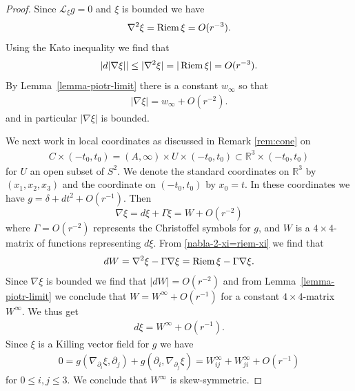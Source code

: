 \documentclass[a4paper,10pt,reqno]{amsart}
\newcommand{\Reals}{\mathbb{R}}
\newcommand{\Riem}{\mathop{\rm Riem}}
\theoremstyle{plain}
\newcommand{\Lie}{\mathcal{L}}
\numberwithin{equation}{section}
\begin{document}
\begin{proof}

Since $\Lie_\xi g = 0$ and $\xi$ is bounded we have 
\begin{equation} \label{nabla-2-xi=riem-xi}
\nabla^2 \xi = \Riem \xi = O(r^{-3}).
\end{equation}
Using the Kato inequality we find that 
\begin{align} 
|d |\nabla \xi| | \leq |\nabla^2 \xi| = |\Riem \xi| = O(r^{-3}).
\end{align} 
By Lemma~\ref{lemma-piotr-limit} there is a constant $w_\infty$ so that
\begin{align} 
|\nabla \xi| = w_\infty + O(r^{-2}).
\end{align} 
and in particular $|\nabla \xi|$ is bounded.

We next work in local coordinates as discussed in Remark \ref{rem:cone} on 
\begin{align}
C \times (-t_0,t_0) = (A, \infty) \times U \times (-t_0,t_0)
\subset \Reals^3 \times (-t_0,t_0) 
\end{align} 
for $U$ an open subset of $S^2$. We denote the standard coordinates on $\Reals^3$ by $(x_1,x_2,x_3)$ and the coordinate on $(-t_0,t_0)$ by $x_0=t$. In these coordinates we have $g = \delta + dt^2 + O(r^{-1})$. Then 
\begin{equation} \label{nabla-xi-local}
\nabla \xi = d \xi + \Gamma \xi = W + O(r^{-2})
\end{equation}
where $\Gamma = O(r^{-2})$ represents the Christoffel symbols for $g$, and $W$ is a $4\times 4$-matrix of functions representing $d\xi$. From \eqref{nabla-2-xi=riem-xi} we find that
\begin{equation} \label{dW-equation}
dW = \nabla^2 \xi - \Gamma \nabla \xi = \Riem \xi - \Gamma \nabla \xi.
\end{equation}
Since $\nabla \xi$ is bounded we find that $|dW| = O(r^{-2})$ and from Lemma~\ref{lemma-piotr-limit} we conclude that $W = W^\infty + O(r^{-1})$ for a constant $4\times 4$-matrix $W^\infty$.
We thus get 
\begin{align}
d\xi = W^\infty + O(r^{-1}). 
\end{align}
Since $\xi$ is a Killing vector field for $g$ we have
\begin{align}
0 = g(\nabla_{\partial_i} \xi, \partial_j) + g(\partial_i, \nabla_{\partial_j} \xi) 
= W^\infty_{ij} + W^\infty_{ji} + O(r^{-1})
\end{align} 
for $0\leq i,j \leq 3$. We conclude that $W^\infty$ is skew-symmetric.


\end{proof}
\end{document}
